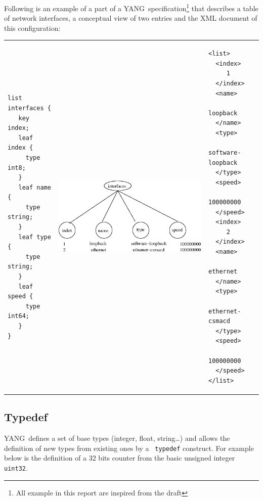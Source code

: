 \documentclass[a4paper]{article}
\newcommand{\y}{YANG}
\begin{document}
Following is an example of  a part of a \y\ specification\footnote{All
example in  this report are  inspired from the  draft\cite{yang01}} that
describes  a table  of network  interfaces, a  conceptual view  of two
entries and the XML document of this configuration:

\noindent
\begin{tabular}{lcl}
\begin{minipage}{.25\textwidth}
\begin{verbatim}
list interfaces {
   key index;
   leaf index {
     type int8;
   }
   leaf name {
     type string;
   }
   leaf type {
     type string;
   }
   leaf speed {
     type int64;
   }
}
\end{verbatim}
\end{minipage}
&
\begin{minipage}{.55\textwidth}
\includegraphics[scale=.6]{listinterface.eps}
\end{minipage}
&
\begin{minipage}{.2\textwidth}
\begin{small}
\begin{verbatim}
<list>
  <index>
     1
  </index>
  <name>
     loopback
  </name>
  <type>
     software-loopback
  </type>
  <speed>
     100000000
  </speed>
  <index>
     2
  </index>
  <name>
     ethernet
  </name>
  <type>
     ethernet-csmacd
  </type>
  <speed>
     100000000
  </speed>
</list>
\end{verbatim}
\end{small}
\end{minipage}
\end{tabular}

\subsection{Typedef}

\y\ defines  a set  of base types  (integer, float,  string\ldots) and
allows  the definition  of  new types  from  existing ones  by a  {\tt
typedef} construct.  For example below  is the definition of a 32 bits
counter from the basic unsigned integer {\tt uint32}.
\end{document}
